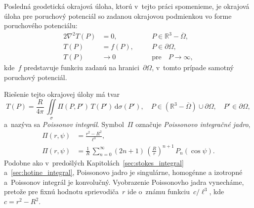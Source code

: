\documentclass[a4paper, 12pt]{book}
\newcommand{\diff}{\mathrm d}
\begin{document}
Posledná geodetická okrajová úloha, ktorú v~tejto práci spomenieme, je okrajová 
úloha pre poruchový potenciál so zadanou okrajovou podmienkou vo forme 
poruchového potenciálu:
%
\begin{alignat}{2}
\nabla^2 T(P) &= 0{,} &&P \in \mathbb{R}^3 
- \overline\Omega{,}\label{eq:bvp_t_laplace}\\
T(P) &= f(P){,} \quad &&P \in 
\partial\Omega{,}\label{eq:bvp_t_boundary_condition}\\
T(P) &\rightarrow 0 &&\textrm{pre} \quad P \rightarrow 
\infty{,}\label{eq:bvp_t_t_infty}
\end{alignat}
%
kde~$f$ predstavuje funkciu zadanú na hranici~$\partial\Omega$, v~tomto prípade 
samotný poruchový potenciál.

Riešenie tejto okrajovej úlohy \parencite[pre odvodenie pozri 
napríklad][]{MoritzPhysicalGeodesy,SansoGeoidDetermination} má tvar
%
\begin{equation}
\label{eq:poisson}
T(P) = \frac{R}{4\pi} \, \iint\limits_\sigma \Pi(P, P') \, T(P') \, 
\diff\sigma(P'){,} \quad P \in \left( \mathbb{R}^3 - \overline\Omega \right) 
\cup \partial\Omega{,} \quad P' \in \partial\Omega{,}
\end{equation}
%
a~nazýva sa \emph{Poissonov integrál}.  Symbol~$\Pi$ označuje \emph{Poissonovo 
integračné jadro},
%
\begin{align}
\Pi(r, \psi) &= \frac{r^2 - R^2}{\ell^3}{,}\label{eq:poisson_kernel}\\
\Pi(r, \psi) &= \frac{1}{R} \, \sum_{n = 0}^{\infty} (2n + 1) \, \left( 
\frac{R}{r} \right)^{n + 1} \, 
P_n(\cos\psi)\label{eq:poisson_kernel_spectral}{.}
\end{align}
%
Podobne ako v~predošlých Kapitolách~\ref{sec:stokes_integral} 
a~\ref{sec:hotine_integral}, Poissonovo jadro je singulárne, homogénne 
a izotropné a~Poissonov integrál je konvolučný.  Vyobrazenie Poissonovho jadra 
vynecháme, pretože pre fixnú hodnotu sprievodiča~$r$ ide o~známu funkciu~$c 
\slash \ell^3$, kde $c = r^2 - R^2$.
\end{document}
